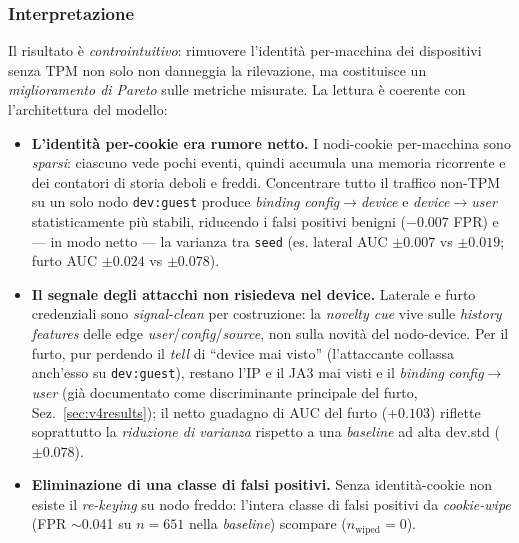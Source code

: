 \documentclass[11pt,a4paper]{report}
\begin{document}
\subsubsection{Interpretazione}

Il risultato è \emph{controintuitivo}: rimuovere l'identità per-macchina dei dispositivi senza TPM non solo non danneggia la rilevazione, ma costituisce un \emph{miglioramento di Pareto} sulle metriche misurate. La lettura è coerente con l'architettura del modello:
\begin{itemize}
    \item \textbf{L'identità per-cookie era rumore netto.} I nodi-cookie per-macchina sono \emph{sparsi}: ciascuno vede pochi eventi, quindi accumula una memoria ricorrente e dei contatori di storia deboli e freddi. Concentrare tutto il traffico non-TPM su un solo nodo \texttt{dev:guest} produce \textit{binding} \textit{config}$\rightarrow$\textit{device} e \textit{device}$\rightarrow$\textit{user} statisticamente più stabili, riducendo i falsi positivi benigni ($-0.007$ FPR) e --- in modo netto --- la varianza tra \texttt{seed} (es. lateral AUC $\pm0.007$ vs $\pm0.019$; furto AUC $\pm0.024$ vs $\pm0.078$).
    \item \textbf{Il segnale degli attacchi non risiedeva nel device.} Laterale e furto credenziali sono \textit{signal-clean} per costruzione: la \textit{novelty cue} vive sulle \textit{history features} delle edge \textit{user}/\textit{config}/\textit{source}, non sulla novità del nodo-device. Per il furto, pur perdendo il \textit{tell} di ``device mai visto'' (l'attaccante collassa anch'esso su \texttt{dev:guest}), restano l'IP e il JA3 mai visti e il \textit{binding} \textit{config}$\rightarrow$\textit{user} (già documentato come discriminante principale del furto, Sez.~\ref{sec:v4results}); il netto guadagno di AUC del furto ($+0.103$) riflette soprattutto la \emph{riduzione di varianza} rispetto a una \textit{baseline} ad alta dev.std ($\pm0.078$).
    \item \textbf{Eliminazione di una classe di falsi positivi.} Senza identità-cookie non esiste il \textit{re-keying} su nodo freddo: l'intera classe di falsi positivi da \textit{cookie-wipe} (FPR $\sim$0.041 su $n{=}651$ nella \textit{baseline}) scompare ($n_{\text{wiped}}{=}0$).
\end{itemize}
\end{document}
